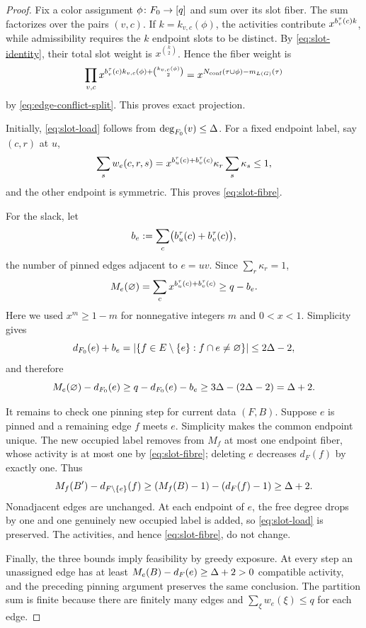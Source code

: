 \begin{proof}
Fix a color assignment \(\phi\colon F_0\to[q]\) and sum over its slot
fiber.  The sum factorizes over the pairs \((v,c)\).  If
\(k=k_{v,c}(\phi)\), the activities contribute
\(x^{b_v^\tau(c)k}\), while admissibility requires the \(k\) endpoint
slots to be distinct.  By \eqref{eq:slot-identity}, their total slot weight
is \(x^{\binom k2}\).  Hence the fiber weight is
\[
  \prod_{v,c}
    x^{b_v^\tau(c)k_{v,c}(\phi)+
       \binom{k_{v,c}(\phi)}2}
  =
  x^{N_{\mathrm{conf}}(\tau\cup\phi)-m_{L(G)}(\tau)}
\]
by \eqref{eq:edge-conflict-split}.  This proves exact projection.

Initially, \eqref{eq:slot-load} follows from
\(\deg_{F_0}(v)\le\Delta\).  For a fixed endpoint label, say \((c,r)\) at \(u\),
\[
  \sum_s w_e(c,r,s)
  =
  x^{b_u^\tau(c)+b_v^\tau(c)}\kappa_r\sum_s \kappa_s
  \le1,
\]
and the other endpoint is symmetric.  This proves
\eqref{eq:slot-fibre}.

For the slack, let
\[
  b_e:=\sum_c\bigl(b_u^\tau(c)+b_v^\tau(c)\bigr),
\]
the number of pinned edges adjacent to \(e=uv\).  Since
\(\sum_r\kappa_r=1\),
\[
  M_e(\varnothing)
  =\sum_c x^{b_u^\tau(c)+b_v^\tau(c)}
  \ge q-b_e.
\]
Here we used \(x^m\ge1-m\) for nonnegative integers \(m\) and \(0<x<1\).
Simplicity gives
\[
  d_{F_0}(e)+b_e
  =
  \left|\left\{f\in E\setminus\left\{e\right\}:f\cap e\ne\varnothing\right\}\right|
  \le2\Delta-2,
\]
and therefore
\[
  M_e(\varnothing)-d_{F_0}(e)
  \ge q-d_{F_0}(e)-b_e
  \ge3\Delta-(2\Delta-2)=\Delta+2.
\]

It remains to check one pinning step for current data \((F,B)\).
Suppose \(e\) is pinned and a
remaining edge \(f\) meets \(e\).  Simplicity makes the common endpoint
unique.  The new occupied label removes from \(M_f\) at most one endpoint
fiber, whose activity is at most one by \eqref{eq:slot-fibre}; deleting
\(e\) decreases \(d_F(f)\) by exactly one.  Thus
\[
  M_f(B')-d_{F\setminus\left\{e\right\}}(f)
  \ge (M_f(B)-1)-(d_F(f)-1)
  \ge\Delta+2.
\]
Nonadjacent edges are unchanged.  At each endpoint of \(e\), the free
degree drops by one and one genuinely new occupied label is added, so
\eqref{eq:slot-load} is preserved.  The activities, and hence
\eqref{eq:slot-fibre}, do not change.

Finally, the three bounds imply feasibility by greedy exposure.  At every
step an unassigned edge has at least
\(M_e(B)-d_F(e)\ge\Delta+2>0\) compatible activity, and the preceding
pinning argument preserves the same conclusion.  The partition sum is
finite because there are finitely many edges and
\(\sum_\xi w_e(\xi)\le q\) for each edge.
\end{proof}

